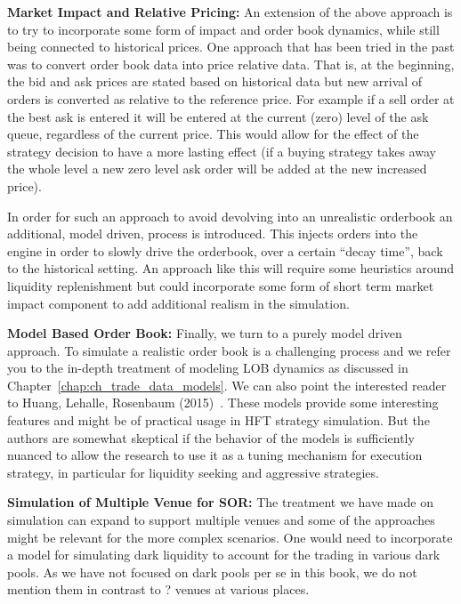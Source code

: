 \noindent\textbf{Market Impact and Relative Pricing:} An extension of the above approach is to try to incorporate some form of impact and order book dynamics, while still being connected to historical prices. One approach that has been tried in the past was to convert order book data into price relative data. That is, at the beginning, the bid and ask prices are stated based on historical data but new arrival of orders is converted as relative to the reference price. For example if a sell order at the best ask is entered it will be entered at the current (zero) level of the ask queue, regardless of the current price. This would allow for the effect of the strategy decision to have a more lasting effect (if a buying strategy takes away the whole level a new zero level ask order will be added at the new increased price). 


In order for such an approach to avoid devolving into an unrealistic orderbook an additional, model driven, process is introduced. This injects orders into the engine in order to slowly drive the orderbook, over a certain ``decay time'', back to the historical setting. An approach like this will require some heuristics around liquidity replenishment but could incorporate some form of short term market impact component to add additional realism in the simulation. \twomedskip


\noindent\textbf{Model Based Order Book:} Finally, we turn to a purely model driven approach. To simulate a realistic order book is a challenging process and we refer you to the in-depth treatment of modeling LOB dynamics as discussed in Chapter~\ref{chap:ch_trade_data_models}. We can also point the interested reader to Huang, Lehalle, Rosenbaum (2015)~\cite{hlehros}. These models provide some interesting features and might be of practical usage in HFT strategy simulation. But the authors are somewhat skeptical if the behavior of the models is sufficiently nuanced to allow the research to use it as a tuning mechanism for execution strategy, in particular for liquidity seeking and aggressive strategies. \twomedskip


\noindent\textbf{Simulation of Multiple Venue for SOR:} The treatment we have made on simulation can expand to support multiple venues and some of the approaches might be relevant for the more complex scenarios. One would need to incorporate a model for simulating dark liquidity to account for the trading in various dark pools. As we have not focused on dark pools per se in this book, we do not mention them in contrast to ? venues at various places.


